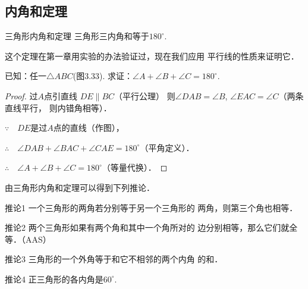 \subsection{内角和定理}

\begin{blk}
  {三角形内角和定理} 三角形三内角和等于$180^{\circ}$.  
\end{blk}

这个定理在第一章用实验的办法验证过，现在我们应用
平行线的性质来证明它．

已知：任一$\triangle ABC$(图3.33). 求证：$\angle A+\angle B+
\angle C=180^{\circ}$.

\begin{figure}[htp]
    \centering
{}
    \caption{}
\end{figure}

\begin{proof}
    过$A$点引直线
$DE\parallel BC$（平行公理）
则$\angle DAB=\angle B$, $\angle EAC=\angle C$（两条直线平行，
则内错角相等）．

$\because\quad DE$是过$A$点的直线（作图），

$\therefore\quad \angle DAB+\angle BAC+\angle CAE=180^{\circ}$（平角定义）．

$\therefore\quad \angle A+\angle B+\angle C=180^{\circ}$（等量代换）．
\end{proof}

由三角形内角和定理可以得到下列推论．

\begin{blk}
    {推论1} 一个三角形的两角若分别等于另一个三角形的
两角，则第三个角也相等．
\end{blk}


\begin{blk}
    {推论2} 两个三角形如果有两个角和其中一个角所对的
边分别相等，那么它们就全等．（AAS）
\end{blk}


\begin{blk}
    {推论3} 三角形的一个外角等于和它不相邻的两个内角
的和．
\end{blk}

\begin{blk}
    {推论4} 正三角形的各内角是$60^{\circ}$.
\end{blk}


